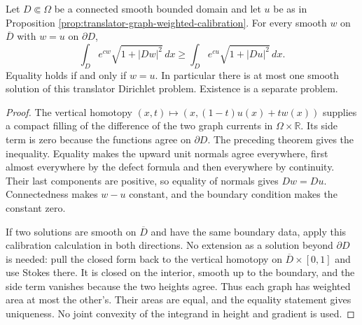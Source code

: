 \begin{corollary}\label{cor:translator-fixed-boundary-graph-minimum}
Let $D\Subset\Omega$ be a connected smooth bounded domain and let $u$ be as in Proposition \ref{prop:translator-graph-weighted-calibration}. For every smooth $w$ on $\overline D$ with $w=u$ on $\partial D$,
\[
 \int_D e^{cw}\sqrt{1+|Dw|^2}\,dx
 \ge\int_D e^{cu}\sqrt{1+|Du|^2}\,dx.
\]
Equality holds if and only if $w=u$. In particular there is at most one smooth solution of this translator Dirichlet problem. Existence is a separate problem.
\end{corollary}
\begin{proof}
The vertical homotopy $(x,t)\mapsto(x,(1-t)u(x)+tw(x))$ supplies a compact filling of the difference of the two graph currents in $\Omega\times\mathbb R$. Its side term is zero because the functions agree on $\partial D$. The preceding theorem gives the inequality. Equality makes the upward unit normals agree everywhere, first almost everywhere by the defect formula and then everywhere by continuity. Their last components are positive, so equality of normals gives $Dw=Du$. Connectedness makes $w-u$ constant, and the boundary condition makes the constant zero.

If two solutions are smooth on $\overline D$ and have the same boundary data, apply this calibration calculation in both directions. No extension as a solution beyond $\partial D$ is needed: pull the closed form back to the vertical homotopy on $\overline D\times[0,1]$ and use Stokes there. It is closed on the interior, smooth up to the boundary, and the side term vanishes because the two heights agree. Thus each graph has weighted area at most the other's. Their areas are equal, and the equality statement gives uniqueness. No joint convexity of the integrand in height and gradient is used.
\end{proof}

